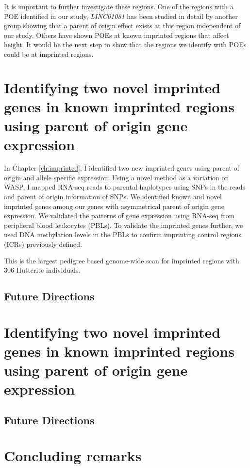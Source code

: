 It is important to further investigate these regions. One of the regions with a POE identified in our study, \emph{LINC01081} has been studied in detail by another group showing that a parent of origin effect exists at this region independent of our study\cite{Szafranski:2016fz}. Others have shown POEs at known imprinted regions that affect height\cite{Benonisdottir:2016dz,Zoledziewska:2015do}. It would be the next step to show that the regions we identify with POEs could be at imprinted regions.
 
\section{Identifying two novel imprinted genes in known imprinted regions using parent of origin gene expression}

 In Chapter \ref{ch:imprinted}, I identified two new imprinted genes using parent of origin and allele specific expression. Using a novel method as a variation on WASP\cite{vandeGeijn:2015hi}, I mapped RNA-seq reads to parental haplotypes using SNPs in the reads and parent of origin information of SNPs. We identified known and novel imprinted genes among our genes with asymmetrical parent of origin gene expression. We validated the patterns of gene expression using RNA-seq from peripheral blood leukocytes (PBLs). To validate the imprinted genes further, we used DNA methylation levels in the PBLs to confirm imprinting control regions (ICRs) previously defined\cite{Joshi:2016bb,Court:2014kc}.
 
This is the largest pedigree based genome-wide scan for imprinted regions with 306 Hutterite individuals. 

 \subsection{Future Directions}




\section{Identifying two novel imprinted genes in known imprinted regions using parent of origin gene expression}


 \subsection{Future Directions}

\section{Concluding remarks}

